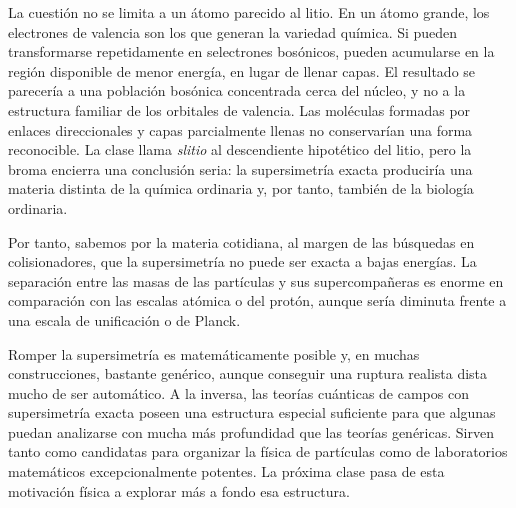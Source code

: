 La cuestión no se limita a un átomo parecido al litio. En un átomo grande, los electrones de valencia son los que generan la variedad química. Si pueden transformarse repetidamente en selectrones bosónicos, pueden acumularse en la región disponible de menor energía, en lugar de llenar capas. El resultado se parecería a una población bosónica concentrada cerca del núcleo, y no a la estructura familiar de los orbitales de valencia. Las moléculas formadas por enlaces direccionales y capas parcialmente llenas no conservarían una forma reconocible. La clase llama \emph{slitio} al descendiente hipotético del litio, pero la broma encierra una conclusión seria: la supersimetría exacta produciría una materia distinta de la química ordinaria y, por tanto, también de la biología ordinaria.

\begin{classroomqa}
\end{classroomqa}

Por tanto, sabemos por la materia cotidiana, al margen de las búsquedas en colisionadores, que la supersimetría no puede ser exacta a bajas energías. La separación entre las masas de las partículas y sus supercompañeras es enorme en comparación con las escalas atómica o del protón, aunque sería diminuta frente a una escala de unificación o de Planck.

\begin{classroomqa}
\end{classroomqa}

Romper la supersimetría es matemáticamente posible y, en muchas construcciones, bastante genérico, aunque conseguir una ruptura realista dista mucho de ser automático. A la inversa, las teorías cuánticas de campos con supersimetría exacta poseen una estructura especial suficiente para que algunas puedan analizarse con mucha más profundidad que las teorías genéricas. Sirven tanto como candidatas para organizar la física de partículas como de laboratorios matemáticos excepcionalmente potentes. La próxima clase pasa de esta motivación física a explorar más a fondo esa estructura.

